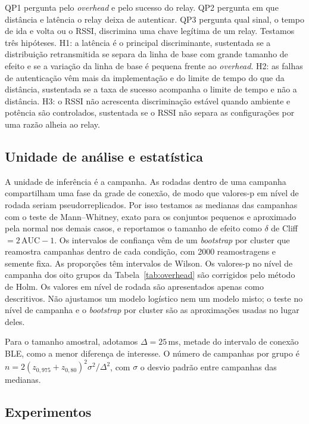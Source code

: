 \documentclass{ieeeaccess}
\begin{document}
QP1 pergunta pelo \emph{overhead} e pelo sucesso do relay. QP2 pergunta em que distância e latência o relay deixa de autenticar. QP3 pergunta qual sinal, o tempo de ida e volta ou o RSSI, discrimina uma chave legítima de um relay. Testamos três hipóteses. H1: a latência é o principal discriminante, sustentada se a distribuição retransmitida se separa da linha de base com grande tamanho de efeito e se a variação da linha de base é pequena frente ao \emph{overhead}. H2: as falhas de autenticação vêm mais da implementação e do limite de tempo do que da distância, sustentada se a taxa de sucesso acompanha o limite de tempo e não a distância. H3: o RSSI não acrescenta discriminação estável quando ambiente e potência são controlados, sustentada se o RSSI não separa as configurações por uma razão alheia ao relay.

\subsection{Unidade de análise e estatística}

A unidade de inferência é a campanha. As rodadas dentro de uma campanha compartilham uma fase da grade de conexão, de modo que valores-p em nível de rodada seriam pseudorreplicados. Por isso testamos as medianas das campanhas com o teste de Mann--Whitney, exato para os conjuntos pequenos e aproximado pela normal nos demais casos, e reportamos o tamanho de efeito como $\delta$ de Cliff $=2\,\mathrm{AUC}-1$. Os intervalos de confiança vêm de um \emph{bootstrap} por cluster que reamostra campanhas dentro de cada condição, com 2000 reamostragens e semente fixa. As proporções têm intervalos de Wilson. Os valores-p no nível de campanha dos oito grupos da Tabela~\ref{tab:overhead} são corrigidos pelo método de Holm. Os valores em nível de rodada são apresentados apenas como descritivos. Não ajustamos um modelo logístico nem um modelo misto; o teste no nível de campanha e o \emph{bootstrap} por cluster são as aproximações usadas no lugar deles.

Para o tamanho amostral, adotamos $\Delta=25$\,ms, metade do intervalo de conexão BLE, como a menor diferença de interesse. O número de campanhas por grupo é $n = 2(z_{0,975}+z_{0,80})^2\sigma^2/\Delta^2$, com $\sigma$ o desvio padrão entre campanhas das medianas.

\subsection{Experimentos}
\end{document}
